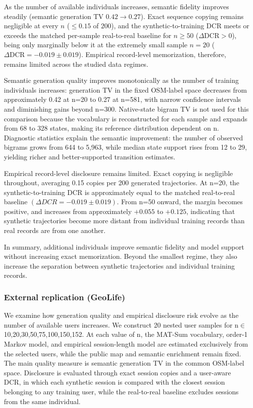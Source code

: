 \documentclass[sigconf,nonacm]{acmart}
\begin{document}
As the number of available individuals increases, semantic fidelity improves steadily (semantic
generation TV $0.42\!\to\!0.27$). Exact sequence copying remains negligible at every $n$ ($\le0.15$ of $200$), and the synthetic-to-training DCR meets or exceeds the matched per-sample
real-to-real baseline for $n\ge50$ ($\Delta\mathrm{DCR}>0$), being only marginally below it at the extremely small sample $n{=}20$ ($\Delta\mathrm{DCR}=-0.019\pm0.019$). Empirical record-level memorization, therefore, remains limited across the studied data regimes.


Semantic generation quality improves monotonically as the number of training individuals increases: generation TV in the fixed OSM-label space decreases from approximately 0.42 at n=20 to 0.27 at n=581, with narrow confidence intervals and diminishing gains beyond n=300. Native-state bigram TV is not used for this comparison because the vocabulary is reconstructed for each sample and expands from 68 to 328 states, making its reference distribution dependent on n. Diagnostic statistics explain the semantic improvement: the number of observed bigrams grows from 644 to 5,963, while median state support rises from 12 to 29, yielding richer and better-supported transition estimates.

Empirical record-level disclosure remains limited. Exact copying is negligible throughout, averaging 0.15 copies per 200 generated trajectories. At n=20, the synthetic-to-training DCR is approximately equal to the matched real-to-real baseline $(\Delta DCR=-0.019 \pm 0.019)$. From n=50 onward, the margin becomes positive, and increases from approximately $+0.055$ to $+0.125$, indicating that synthetic trajectories become more distant from individual training records than real records are from one another.


In summary, additional individuals improve semantic fidelity and model support without increasing exact memorization. Beyond the smallest regime, they also increase the separation between synthetic trajectories and individual training records.

\subsubsection*{External replication (GeoLife)}
\label{sec:geolife-e2}

We examine how generation quality and empirical disclosure risk evolve as the number of available users increases. We construct 20 nested user samples for n$\in${10,20,30,50,75,100,150,152}. At each value of n, the MAT-Sum vocabulary, order-1 Markov model, and empirical session-length model are estimated exclusively from the selected users, while the public map and semantic enrichment remain fixed. The main quality measure is semantic generation TV in the common OSM-label space. Disclosure is evaluated through exact session copies and a user-aware DCR, in which each synthetic session is compared with the closest session belonging to any training user, while the real-to-real baseline excludes sessions from the same individual.
\end{document}
